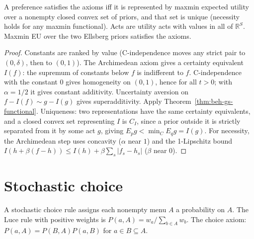 \begin{theorem}
\label{thm:beh-gs-main}
\leanok
{}
A preference satisfies the axioms iff it is represented by maxmin expected utility over a nonempty closed convex
set of priors, and that set is unique (necessity holds for any maxmin functional). Acts are utility acts with
values in all of $\mathbb{R}^S$. Maxmin EU over the two Ellsberg priors satisfies the axioms.
\end{theorem}
\begin{proof}
\leanok
Constants are ranked by value (C-independence moves any strict pair to $(0,\delta)$, then to $(0,1)$). The Archimedean
axiom gives a certainty equivalent $I(f)$: the supremum of constants below $f$ is indifferent to $f$. C-independence
with the constant $0$ gives homogeneity on $(0,1)$, hence for all $t>0$; with $\alpha=1/2$ it gives constant
additivity. Uncertainty aversion on $f-I(f)\sim g-I(g)$ gives superadditivity. Apply
Theorem~\ref{thm:beh-gs-functional}. Uniqueness: two representations have the same certainty equivalents, and a closed convex set representing $I$ is
$C_I$, since a prior outside it is strictly separated from it by some act $g$, giving $E_pg<\min_CE_qg=I(g)$. For necessity, the Archimedean step uses concavity
($\alpha$ near $1$) and the 1-Lipschitz bound $I(h+\beta(f-h))\le I(h)+\beta\sum_s|f_s-h_s|$ ($\beta$ near $0$).
\end{proof}

\section{Stochastic choice}
\label{sec:beh-stochastic-choice}

\begin{definition}
\label{def:beh-luce}
\leanok
A stochastic choice rule assigns each nonempty menu $A$ a probability on $A$. The Luce rule with positive weights
is $P(a,A)=w_a/\sum_{b\in A}w_b$. The choice axiom: $P(a,A)=P(B,A)P(a,B)$ for $a\in B\subseteq A$.
\end{definition}

